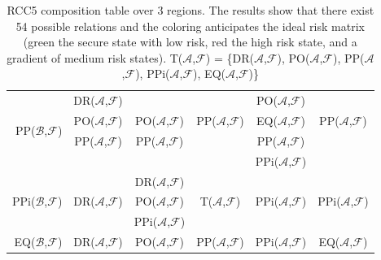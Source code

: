 \documentclass[conference]{IEEEtran}
\newcommand{\assertionRegion}{\mathcal{A}}
\newcommand{\beliefRegion}{\mathcal{B}}
\newcommand{\factRegion}{\mathcal{F}}
\newcommand{\eq}[2]{EQ(#1,#2)}
\newcommand{\pp}[2]{PP(#1,#2)}
\newcommand{\po}[2]{PO(#1,#2)}
\newcommand{\ppi}[2]{PPi(#1,#2)}
\newcommand{\dr}[2]{DR(#1,#2)}
\newcommand{\all}[2]{T(#1,#2)}
\begin{document}
\begin{table}[t]
\begin{adjustbox}{width=.6\textwidth}
\begin{tabular}{r||c|c|c|c|c}
	\cellcolor{abf-rg-4}& %
	\cellcolor{abf-rg-5}\\ %
\hline %
 \multirow{4}{*}{\pp{$\beliefRegion$}{$\factRegion$}} &
	\cellcolor{abf-rg-2}\dr{$\assertionRegion$}{$\factRegion$} & 
	\cellcolor{abf-rg-3}&
	\cellcolor{abf-rg-4} & %
	\cellcolor{abf-rg-5}\po{$\assertionRegion$}{$\factRegion$} & %
	\cellcolor{abf-rg-6}\\ %
 & \cellcolor{abf-rg-2}\po{$\assertionRegion$}{$\factRegion$} & 
	\cellcolor{abf-rg-3}\po{$\assertionRegion$}{$\factRegion$} & 
	\cellcolor{abf-rg-4}\pp{$\assertionRegion$}{$\factRegion$} & %
	\cellcolor{abf-rg-5}\eq{$\assertionRegion$}{$\factRegion$} & %
	\cellcolor{abf-rg-6}\pp{$\assertionRegion$}{$\factRegion$} \\ %
 & \cellcolor{abf-rg-2}\pp{$\assertionRegion$}{$\factRegion$} & 
	\cellcolor{abf-rg-3}\pp{$\assertionRegion$}{$\factRegion$} & 
	\cellcolor{abf-rg-4} & %
	\cellcolor{abf-rg-5}\pp{$\assertionRegion$}{$\factRegion$} & %
	\cellcolor{abf-rg-6} \\ %
 & \cellcolor{abf-rg-2}&
 	\cellcolor{abf-rg-3} & 
	\cellcolor{abf-rg-4}& %
	\cellcolor{abf-rg-5}\ppi{$\assertionRegion$}{$\factRegion$} & %
	\cellcolor{abf-rg-6} \\ %
\hline %
 \multirow{3}{*}{\ppi{$\beliefRegion$}{$\factRegion$}} &
 	\cellcolor{abf-rg-3}\multirow{3}{*}{} &
 	\cellcolor{abf-rg-4}\dr{$\assertionRegion$}{$\factRegion$} &
 	\cellcolor{abf-rg-5}& %
 	\cellcolor{abf-rg-6}& %
 	\cellcolor{abf-rg-7} \\ %
& \cellcolor{abf-rg-3}\dr{$\assertionRegion$}{$\factRegion$} &
 	\cellcolor{abf-rg-4}\po{$\assertionRegion$}{$\factRegion$} & 
 	\cellcolor{abf-rg-5}\all{$\assertionRegion$}{$\factRegion$}& %
 	\cellcolor{abf-rg-6}\ppi{$\assertionRegion$}{$\factRegion$}& %
 	\cellcolor{abf-rg-7}\ppi{$\assertionRegion$}{$\factRegion$}\\ %
& \cellcolor{abf-rg-3} & 
	\cellcolor{abf-rg-4}\ppi{$\assertionRegion$}{$\factRegion$} & 
	\cellcolor{abf-rg-5} & %
	\cellcolor{abf-rg-6}& %
	\cellcolor{abf-rg-7}\\ %
\hline %
	\eq{$\beliefRegion$}{$\factRegion$} & 
	\cellcolor{abf-rg-4}\dr{$\assertionRegion$}{$\factRegion$} & 
	\cellcolor{abf-rg-5} \po{$\assertionRegion$}{$\factRegion$} & 
	\cellcolor{abf-rg-6}\pp{$\assertionRegion$}{$\factRegion$} & %
	\cellcolor{abf-rg-7} \ppi{$\assertionRegion$}{$\factRegion$} & %
	\cellcolor{abfgreen} \eq{$\assertionRegion$}{$\factRegion$}  %
\end{tabular}
\end{adjustbox}
\caption{RCC5 composition table over 3 regions. The results show that there
exist 54 possible relations and the coloring anticipates the ideal risk matrix
(green the secure state with low risk, red the high risk state, and a gradient
of medium risk states). 
\all{$\assertionRegion$}{$\factRegion$} = \{\dr{$\assertionRegion$}{$\factRegion$}, \po{$\assertionRegion$}{$\factRegion$}, \pp{$\assertionRegion$}{$\factRegion$}, \ppi{$\assertionRegion$}{$\factRegion$}, \eq{$\assertionRegion$}{$\factRegion$}\}
\label{tab:5com}}
\end{table}
\end{document}
